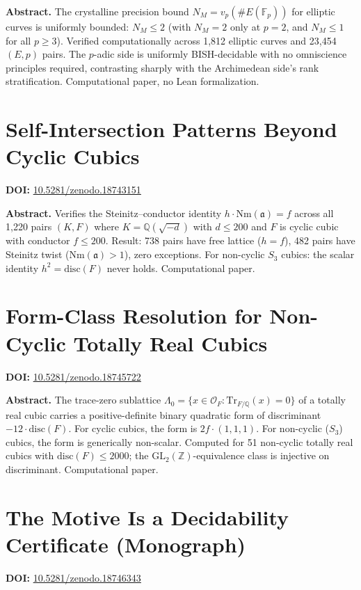 \documentclass[11pt,a4paper]{article}
\begin{document}
\bigskip
\noindent\textbf{Abstract.}
The crystalline precision bound $N_M=v_p(\#E(\mathbb{F}_p))$ for elliptic curves is uniformly bounded: $N_M\le2$ (with $N_M=2$ only at $p=2$, and $N_M\le1$ for all $p\ge3$). Verified computationally across 1,812 elliptic curves and 23,454 $(E,p)$ pairs. The $p$-adic side is uniformly BISH-decidable with no omniscience principles required, contrasting sharply with the Archimedean side's rank stratification. Computational paper, no Lean formalization.

\section{Self-Intersection Patterns Beyond Cyclic Cubics}
\label{sec:p65}
\textbf{DOI:} \href{https://doi.org/10.5281/zenodo.18743151}{10.5281/zenodo.18743151}

\bigskip
\noindent\textbf{Abstract.}
Verifies the Steinitz--conductor identity $h\cdot\mathrm{Nm}(\mathfrak{a})=f$ across all 1,220 pairs $(K,F)$ where $K=\mathbb{Q}(\sqrt{-d})$ with $d\le200$ and $F$ is cyclic cubic with conductor $f\le200$. Result: 738 pairs have free lattice ($h=f$), 482 pairs have Steinitz twist ($\mathrm{Nm}(\mathfrak{a})>1$), zero exceptions. For non-cyclic $S_3$ cubics: the scalar identity $h^2=\mathrm{disc}(F)$ never holds. Computational paper.

\section{Form-Class Resolution for Non-Cyclic Totally Real Cubics}
\label{sec:p66}
\textbf{DOI:} \href{https://doi.org/10.5281/zenodo.18745722}{10.5281/zenodo.18745722}

\bigskip
\noindent\textbf{Abstract.}
The trace-zero sublattice $\Lambda_0=\{x\in\mathcal{O}_F:\mathrm{Tr}_{F/\mathbb{Q}}(x)=0\}$ of a totally real cubic carries a positive-definite binary quadratic form of discriminant $-12\cdot\mathrm{disc}(F)$. For cyclic cubics, the form is $2f\cdot(1,1,1)$. For non-cyclic ($S_3$) cubics, the form is generically non-scalar. Computed for 51 non-cyclic totally real cubics with $\mathrm{disc}(F)\le2000$; the $\mathrm{GL}_2(\mathbb{Z})$-equivalence class is injective on discriminant. Computational paper.

\section{The Motive Is a Decidability Certificate (Monograph)}
\label{sec:p67}
\textbf{DOI:} \href{https://doi.org/10.5281/zenodo.18746343}{10.5281/zenodo.18746343}
\end{document}
